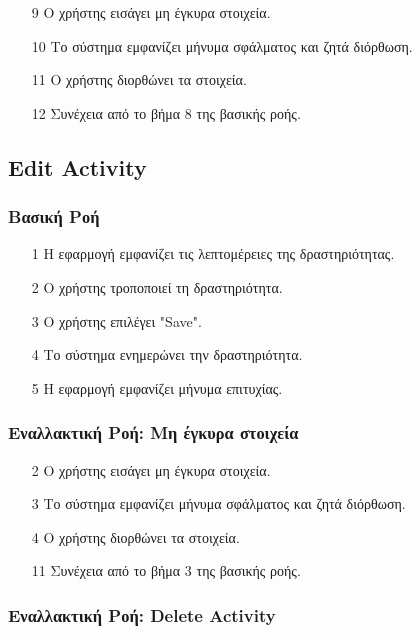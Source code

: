 \begin{enumerate}
    \item[9] Ο χρήστης εισάγει μη έγκυρα στοιχεία.
    \item[10] Το σύστημα εμφανίζει μήνυμα σφάλματος και ζητά διόρθωση.
    \item[11] Ο χρήστης διορθώνει τα στοιχεία.
    \item[12] Συνέχεια από το βήμα 8 της βασικής ροής.
\end{enumerate}

\subsection{Edit Activity}

\subsubsection{Βασική Ροή}

\begin{enumerate}
    \item[1] Η εφαρμογή εμφανίζει τις λεπτομέρειες της δραστηριότητας.
    \item[2] Ο χρήστης τροποποιεί τη δραστηριότητα.
    \item[3] O χρήστης επιλέγει "Save".
    \item[4] Το σύστημα ενημερώνει την δραστηριότητα.
    \item[5] Η εφαρμογή εμφανίζει μήνυμα επιτυχίας.
\end{enumerate}

\subsubsection{Εναλλακτική Ροή: Μη έγκυρα στοιχεία}

\begin{enumerate}
    \item[2] Ο χρήστης εισάγει μη έγκυρα στοιχεία.
    \item[3] Το σύστημα εμφανίζει μήνυμα σφάλματος και ζητά διόρθωση.
    \item[4] Ο χρήστης διορθώνει τα στοιχεία.
    \item[11] Συνέχεια από το βήμα 3 της βασικής ροής.
\end{enumerate}

\subsubsection{Εναλλακτική Ροή: Delete Activity}

